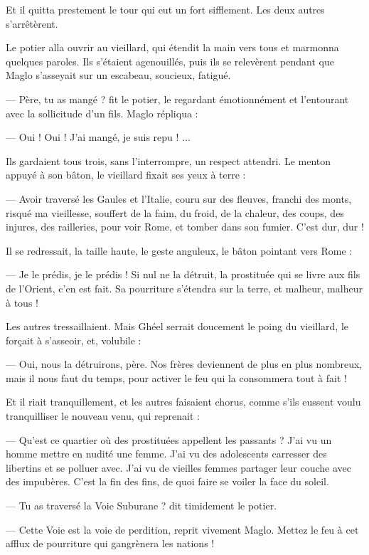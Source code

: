\documentclass[a4paper, 11pt, oneside, polutonikogreek, french]{article}
\begin{document}
Et il quitta prestement le tour qui eut un fort sifflement. Les deux autres s'arrêtèrent.

Le potier alla ouvrir au vieillard, qui étendit la main vers tous et marmonna quelques paroles. Ils s'étaient agenouillés, puis ils se relevèrent pendant que Maglo s'asseyait sur un escabeau, soucieux, fatigué.

--- Père, tu as mangé ? fit le potier, le regardant émotionnément et l'entourant avec la sollicitude d'un fils. Maglo répliqua :

--- Oui ! Oui ! J'ai mangé, je suis repu ! ...

Ils gardaient tous trois, sans l'interrompre, un respect attendri. Le menton appuyé à son bâton, le vieillard fixait ses yeux à terre :

--- Avoir traversé les Gaules et l'Italie, couru sur des fleuves, franchi des monts, risqué ma vieillesse, souffert de la faim, du froid, de la chaleur, des coups, des injures, des railleries, pour voir Rome, et tomber dans son fumier. C'est dur, dur !

Il se redressait, la taille haute, le geste anguleux, le bâton pointant vers Rome :

--- Je le prédis, je le prédis ! Si nul ne la détruit, la prostituée qui se livre aux fils de l'Orient, c'en est fait. Sa pourriture s'étendra sur la terre, et malheur, malheur à tous !

Les autres tressaillaient. Mais Ghéel serrait doucement le poing du vieillard, le forçait à s'asseoir, et, volubile :

--- Oui, nous la détruirons, père. Nos frères deviennent de plus en plus nombreux, mais il nous faut du temps, pour activer le feu qui la consommera tout à fait !

Et il riait tranquillement, et les autres faisaient chorus, comme s'ils eussent voulu tranquilliser le nouveau venu, qui reprenait :

--- Qu'est ce quartier où des prostituées appellent les passants ? J'ai vu un homme mettre en nudité une femme. J'ai vu des adolescents carresser des libertins et se polluer avec. J'ai vu de vieilles femmes partager leur couche avec des impubères. C'est la fin des fins, de quoi faire se voiler la face du soleil.

--- Tu as traversé la Voie Suburane ? dit timidement le potier.

--- Cette Voie est la voie de perdition, reprit vivement Maglo. Mettez le feu à cet afflux de pourriture qui gangrènera les nations !
\end{document}
